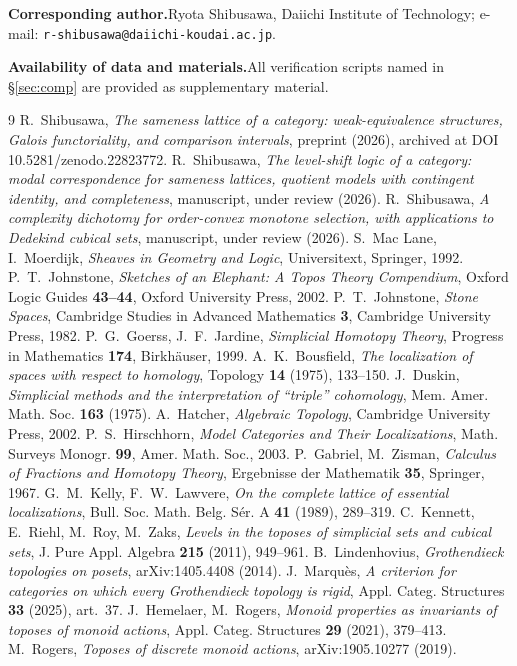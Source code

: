 \documentclass[11pt]{amsart}
\theoremstyle{definition}
\begin{document}
\noindent\textbf{Corresponding author.}\quad Ryota Shibusawa, Daiichi Institute
of Technology; e-mail: \texttt{r-shibusawa@daiichi-koudai.ac.jp}.

\noindent\textbf{Availability of data and materials.}\quad All verification
scripts named in \S\ref{sec:comp} are provided as supplementary material.

\begin{thebibliography}{9}
 R.~Shibusawa, \emph{The sameness lattice of a category:
weak-equivalence structures, Galois functoriality, and comparison intervals},
preprint (2026), archived at DOI 10.5281/zenodo.22823772.
 R.~Shibusawa, \emph{The level-shift logic of a category: modal
correspondence for sameness lattices, quotient models with contingent
identity, and completeness}, manuscript, under review (2026).
 R.~Shibusawa, \emph{A complexity dichotomy for order-convex
monotone selection, with applications to Dedekind cubical sets}, manuscript,
under review (2026).
 S.~Mac Lane, I.~Moerdijk, \emph{Sheaves in Geometry and Logic},
Universitext, Springer, 1992.
 P.~T.~Johnstone, \emph{Sketches of an Elephant: A Topos
Theory Compendium}, Oxford Logic Guides \textbf{43--44}, Oxford University
Press, 2002.
 P.~T.~Johnstone, \emph{Stone Spaces}, Cambridge Studies in
Advanced Mathematics \textbf{3}, Cambridge University Press, 1982.
 P.~G.~Goerss, J.~F.~Jardine, \emph{Simplicial Homotopy Theory},
Progress in Mathematics \textbf{174}, Birkh\"auser, 1999.
 A.~K.~Bousfield, \emph{The localization of spaces with
respect to homology}, Topology \textbf{14} (1975), 133--150.
 J.~Duskin, \emph{Simplicial methods and the interpretation
of ``triple'' cohomology}, Mem. Amer. Math. Soc. \textbf{163} (1975).
 A.~Hatcher, \emph{Algebraic Topology}, Cambridge University
Press, 2002.
 P.~S.~Hirschhorn, \emph{Model Categories and Their
Localizations}, Math. Surveys Monogr. \textbf{99}, Amer. Math. Soc., 2003.
 P.~Gabriel, M.~Zisman, \emph{Calculus of Fractions and Homotopy
Theory}, Ergebnisse der Mathematik \textbf{35}, Springer, 1967.
 G.~M.~Kelly, F.~W.~Lawvere, \emph{On the complete lattice of
essential localizations}, Bull. Soc. Math. Belg. S\'er. A \textbf{41} (1989),
289--319.
 C.~Kennett, E.~Riehl, M.~Roy, M.~Zaks, \emph{Levels in the
toposes of simplicial sets and cubical sets}, J. Pure Appl. Algebra
\textbf{215} (2011), 949--961.
 B.~Lindenhovius, \emph{Grothendieck topologies on posets},
arXiv:1405.4408 (2014).
 J.~Marqu\`es, \emph{A criterion for categories on which
every Grothendieck topology is rigid}, Appl. Categ. Structures \textbf{33}
(2025), art.\ 37.
 J.~Hemelaer, M.~Rogers, \emph{Monoid properties as invariants of
toposes of monoid actions}, Appl. Categ. Structures \textbf{29} (2021),
379--413.
 M.~Rogers, \emph{Toposes of discrete monoid actions},
arXiv:1905.10277 (2019).
\end{thebibliography}
\end{document}

